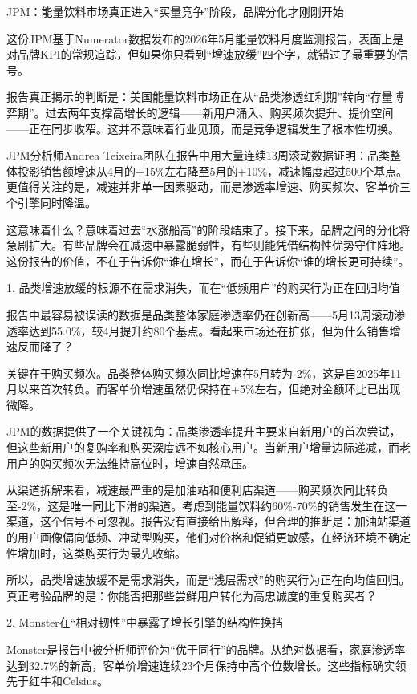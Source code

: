 \documentclass[11pt]{ctexart}
\begin{document}
JPM：能量饮料市场真正进入“买量竞争”阶段，品牌分化才刚刚开始

这份JPM基于Numerator数据发布的2026年5月能量饮料月度监测报告，表面上是对品牌KPI的常规追踪，但如果你只看到“增速放缓”四个字，就错过了最重要的信号。

报告真正揭示的判断是：美国能量饮料市场正在从“品类渗透红利期”转向“存量博弈期”。过去两年支撑高增长的逻辑——新用户涌入、购买频次提升、提价空间——正在同步收窄。这并不意味着行业见顶，而是竞争逻辑发生了根本性切换。

JPM分析师Andrea Teixeira团队在报告中用大量连续13周滚动数据证明：品类整体投影销售额增速从4月的+15\%左右降至5月的+10\%，减速幅度超过500个基点。更值得关注的是，减速并非单一因素驱动，而是渗透率增速、购买频次、客单价三个引擎同时降温。

这意味着什么？意味着过去“水涨船高”的阶段结束了。接下来，品牌之间的分化将急剧扩大。有些品牌会在减速中暴露脆弱性，有些则能凭借结构性优势守住阵地。这份报告的价值，不在于告诉你“谁在增长”，而在于告诉你“谁的增长更可持续”。

1. 品类增速放缓的根源不在需求消失，而在“低频用户”的购买行为正在回归均值

报告中最容易被误读的数据是品类整体家庭渗透率仍在创新高——5月13周滚动渗透率达到55.0\%，较4月提升约80个基点。看起来市场还在扩张，但为什么销售增速反而降了？

关键在于购买频次。品类整体购买频次同比增速在5月转为-2\%，这是自2025年11月以来首次转负。而客单价增速虽然仍保持在+5\%左右，但绝对金额环比已出现微降。

JPM的数据提供了一个关键视角：品类渗透率提升主要来自新用户的首次尝试，但这些新用户的复购率和购买深度远不如核心用户。当新用户增量边际递减，而老用户的购买频次无法维持高位时，增速自然承压。

从渠道拆解来看，减速最严重的是加油站和便利店渠道——购买频次同比转负至-2\%，这是唯一同比下滑的渠道。考虑到能量饮料约60\%-70\%的销售发生在这一渠道，这个信号不可忽视。报告没有直接给出解释，但合理的推断是：加油站渠道的用户画像偏向低频、冲动型购买，他们对价格和促销更敏感，在经济环境不确定性增加时，这类购买行为最先收缩。

所以，品类增速放缓不是需求消失，而是“浅层需求”的购买行为正在向均值回归。真正考验品牌的是：你能否把那些尝鲜用户转化为高忠诚度的重复购买者？

2. Monster在“相对韧性”中暴露了增长引擎的结构性换挡

Monster是报告中被分析师评价为“优于同行”的品牌。从绝对数据看，家庭渗透率达到32.7\%的新高，客单价增速连续23个月保持中高个位数增长。这些指标确实领先于红牛和Celsius。
\end{document}
